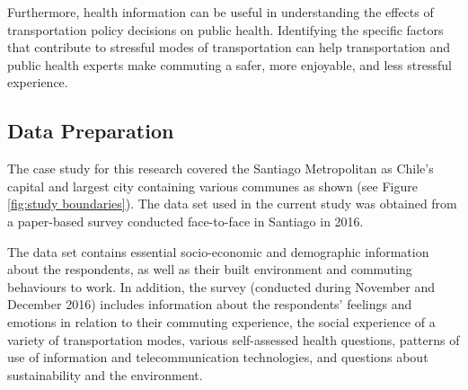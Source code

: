 \documentclass[
11pt, %
oneside, %
english, %
singlespacing, %
]{macthesis} %
\begin{document}
Furthermore, health information can be useful in understanding the effects of transportation policy decisions on public health. Identifying the specific factors that contribute to stressful modes of transportation can help transportation and public health experts make commuting a safer, more enjoyable, and less stressful experience.

\hypertarget{data-preparation}{%
\subsection{Data Preparation}\label{data-preparation}}

The case study for this research covered the Santiago Metropolitan as Chile's capital and largest city containing various communes as shown (see Figure \ref{fig:study boundaries}). The data set used in the current study was obtained from a paper-based survey conducted face-to-face in Santiago in 2016.

The data set contains essential socio-economic and demographic information about the respondents, as well as their built environment and commuting behaviours to work. In addition, the survey (conducted during November and December 2016) includes information about the respondents' feelings and emotions in relation to their commuting experience, the social experience of a variety of transportation modes, various self-assessed health questions, patterns of use of information and telecommunication technologies, and questions about sustainability and the environment.
\end{document}
